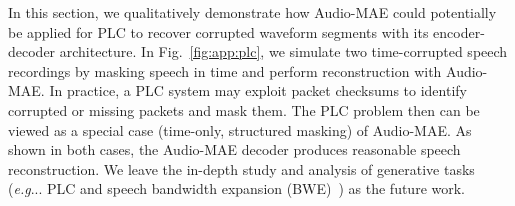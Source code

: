 \documentclass{article}
\makeatletter
\DeclareRobustCommand\onedot{\futurelet\@let@token\@onedot}
\def\@onedot{\ifx\@let@token.\else.\null\fi\xspace}
\def\eg{\emph{e.g}\onedot} \def\Eg{\emph{E.g}\onedot}
\makeatother
\begin{document}
In this section, we qualitatively demonstrate how Audio-MAE could potentially be applied for PLC to recover corrupted waveform segments with its encoder-decoder architecture. In Fig.~\ref{fig:app:plc}, we simulate two time-corrupted speech recordings by masking speech in time and perform reconstruction with Audio-MAE.
In practice, a PLC system may exploit packet checksums to identify corrupted or missing packets and mask them. The PLC problem then can be viewed as a special case (time-only, structured masking) of Audio-MAE. As shown in both cases, the Audio-MAE decoder produces reasonable speech reconstruction.
We leave the in-depth study and analysis of generative tasks (\eg. PLC and speech bandwidth expansion (BWE)~\cite{LiuTWLB15,Nagrani2020VoxcelebLS}) as the future work.
\end{document}
